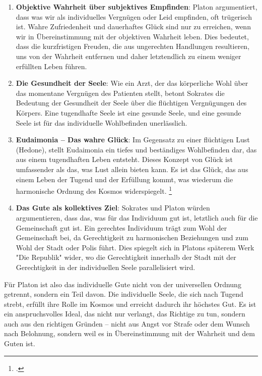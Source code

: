 \documentclass[12pt,a4paper]{article}
\begin{document}
\begin{enumerate}
\item 
\textbf{Objektive Wahrheit über subjektives Empfinden}: Platon argumentiert, dass was wir als individuelles Vergnügen oder Leid empfinden, oft trügerisch ist. Wahre Zufriedenheit und dauerhaftes Glück sind nur zu erreichen, wenn wir in Übereinstimmung mit der objektiven Wahrheit leben. Dies bedeutet, dass die kurzfristigen Freuden, die aus ungerechten Handlungen resultieren, uns von der Wahrheit entfernen und daher letztendlich zu einem weniger erfüllten Leben führen.

\item
\textbf{Die Gesundheit der Seele}: Wie ein Arzt, der das körperliche Wohl über das momentane Vergnügen des Patienten stellt, betont Sokrates die Bedeutung der Gesundheit der Seele über die flüchtigen Vergnügungen des Körpers. Eine tugendhafte Seele ist eine gesunde Seele, und eine gesunde Seele ist für das individuelle Wohlbefinden unerlässlich.

\item
\textbf{Eudaimonia – Das wahre Glück}: Im Gegensatz zu einer flüchtigen Lust (Hedone), stellt Eudaimonia ein tiefes und beständiges Wohlbefinden dar, das aus einem tugendhaften Leben entsteht. Dieses Konzept von Glück ist umfassender als das, was Lust allein bieten kann. Es ist das Glück, das aus einem Leben der Tugend und der Erfüllung kommt, was wiederum die harmonische Ordnung des Kosmos widerspiegelt. \footcite[508a]{gorgias}

\item
\textbf{Das Gute als kollektives Ziel}: Sokrates und Platon würden argumentieren, dass das, was für das Individuum gut ist, letztlich auch für die Gemeinschaft gut ist. Ein gerechtes Individuum trägt zum Wohl der Gemeinschaft bei, da Gerechtigkeit zu harmonischen Beziehungen und zum Wohl der Stadt oder Polis führt. Dies spiegelt sich in Platons späterem Werk "Die Republik" wider, wo die Gerechtigkeit innerhalb der Stadt mit der Gerechtigkeit in der individuellen Seele parallelisiert wird.
\end{enumerate}

Für Platon ist also das individuelle Gute nicht von der universellen Ordnung getrennt, sondern ein Teil davon. Die individuelle Seele, die sich nach Tugend strebt, erfüllt ihre Rolle im Kosmos und erreicht dadurch ihr höchstes Gut. Es ist ein anspruchsvolles Ideal, das nicht nur verlangt, das Richtige zu tun, sondern auch aus den richtigen Gründen – nicht aus Angst vor Strafe oder dem Wunsch nach Belohnung, sondern weil es in Übereinstimmung mit der Wahrheit und dem Guten ist.
\end{document}

